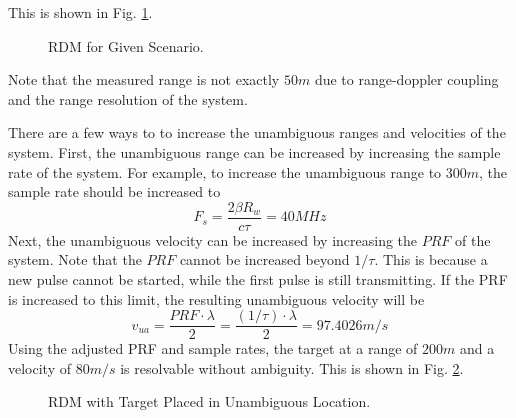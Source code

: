 \documentclass[conference]{IEEEtran}
\begin{document}
This is shown in Fig. \ref{RDM3}.
\begin{figure}[H]
\centerline{}
\caption{RDM for Given Scenario.}
\label{RDM3}
\end{figure}
Note that the measured range is not exactly $50m$ due to range-doppler coupling and the range resolution of the system.
\par
There are a few ways to to increase the unambiguous ranges and velocities of the system. First, the unambiguous range can be increased by increasing the sample rate of the system. For example, to increase the unambiguous range to $300m$, the sample rate should be increased to 
\begin{equation}
F_s = \frac{2\beta R_w}{c\tau} = 40MHz
\end{equation}
Next, the unambiguous velocity can be increased by increasing the $PRF$ of the system. Note that the $PRF$ cannot be increased beyond $1/\tau$. This is because a new pulse cannot be started, while the first pulse is still transmitting. If the PRF is increased to this limit, the resulting unambiguous velocity will be
\begin{equation}
v_{ua} = \frac{PRF\cdot\lambda}{2} = \frac{(1/\tau)\cdot\lambda}{2} = 97.4026 m/s
\end{equation}
Using the adjusted PRF and sample rates, the target at a range of $200m$ and a velocity of $80m/s$ is resolvable without ambiguity. This is shown in Fig. \ref{RDM3_resolvable}.
\begin{figure}[H]
\centerline{}
\caption{RDM with Target Placed in Unambiguous Location.}
\label{RDM3_resolvable}
\end{figure}
\end{document}
